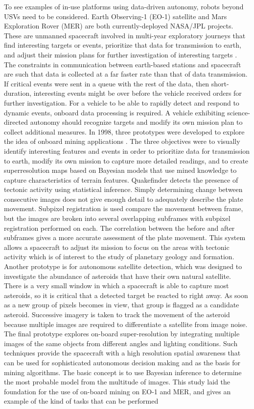 \documentclass{tamuccthesis}
\begin{document}
To see examples of in-use platforms using data-driven autonomy, robots beyond USVs need to be considered. Earth Observing-1 (EO-1) satellite and Mars Exploration Rover (MER) are both currently-deployed NASA/JPL projects. These are unmanned spacecraft involved in multi-year exploratory journeys that find interesting targets or events, prioritize that data for transmission to earth, and adjust their mission plans for further investigation of interesting targets \cite{castano:2006:onboard}. The constraints in communication between earth-based stations and spacecraft are such that data is collected at a far faster rate than that of data transmission. If critical events were sent in a queue with the rest of the data, then short-duration, interesting events might be over before the vehicle received orders for further investigation. For a vehicle to be able to rapidly detect and respond to dynamic events, onboard data processing is required. A vehicle exhibiting science-directed autonomy should recognize targets and modify its own mission plan to collect additional measures. In 1998, three prototypes were developed to explore the idea of onboard mining applications \cite{stolorz:1998}. The three objectives were to visually identify interesting features and events in order to prioritize data for transmission to earth, modify its own mission to capture more detailed readings, and to create superresolution maps based on Bayesian models that use mined knowledge to capture characteristics of terrain features. Quakefinder detects the presence of tectonic activity using statistical inference. Simply determining change between consecutive images does not give enough detail to adequately describe the plate movement. Subpixel registration is used compare the movement between frame, but the images are broken into several overlapping subframes with subpixel registration performed on each. The correlation between the before and after subframes gives a more accurate assessment of the plate movement. This system allows a  spacecraft to adjust its mission to focus on the areas with tectonic activity which is of interest to the study of planetary geology and formation. Another prototype is for autonomous satellite detection, which was designed to investigate the abundance of asteroids that have their own natural satellite. There is a very small window in which a spacecraft is able to capture most asteroids, so it is critical that a detected target be reacted to right away. As soon as a new group of pixels becomes in view, that group is flagged as a candidate asteroid. Successive imagery is taken to track the movement of the asteroid because multiple images are required to differentiate a satellite from image noise. The final prototype explores on-board super-resolution by integrating multiple images of the same objects from different angles and lighting conditions. Such techniques provide the spacecraft with a high resolution spatial awareness that can be used for sophisticated autonomous decision making and as the basis for mining algorithms. The basic concept is to use Bayesian inference to determine the most probable model from the multitude of images. This study laid the foundation for the use of on-board mining on EO-1 and MER, and gives an example of the kind of tasks that can be performed 
\end{document}
